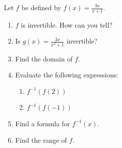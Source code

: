 \documentclass[noauthor]{ximera}
\begin{document}
\begin{problem}
Let \(f\) be defined by \(f(x) = \frac{3x}{x + 1}\).
 
\begin{enumerate}
\item \(f\) is invertible. How can you tell?
\item Is \(g(x) = \frac{3x}{x^2 + 1}\) invertible?
\item Find the domain of \(f\).
\item Evaluate the following expressions:
\begin{enumerate}
    \item \(f^{-1}(f(2))\)
    \item \(f^{-1}(f(-1))\)
\end{enumerate}
\item Find a formula for \(f^{-1}(x)\).
\item Find the range of \(f\).
\end{enumerate}
 

\end{problem}
\end{document}
